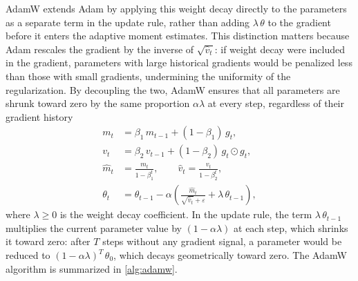AdamW extends Adam by applying this weight decay directly to the
parameters as a separate term in the update rule, rather than adding
$\lambda\,\theta$ to the gradient before it enters the adaptive moment
estimates. This distinction matters because Adam rescales the gradient by
the inverse of $\sqrt{\hat{v}_t}$: if weight decay were included in the
gradient, parameters with large historical gradients would be penalized
less than those with small gradients, undermining the uniformity of the
regularization. By decoupling the two, AdamW ensures that all parameters
are shrunk toward zero by the same proportion $\alpha \lambda$ at every
step, regardless of their gradient history
\begin{align*}
    m_t &= \beta_1\, m_{t-1} + (1 - \beta_1)\, g_t, \\
    v_t &= \beta_2\, v_{t-1} + (1 - \beta_2)\, g_t \odot g_t, \\
    \hat{m}_t &= \frac{m_t}{1 - \beta_1^t}, \qquad
    \hat{v}_t = \frac{v_t}{1 - \beta_2^t}, \\
    \theta_t &= \theta_{t-1}
      - \alpha \left(
        \frac{\hat{m}_t}{\sqrt{\hat{v}_t} + \varepsilon}
        + \lambda\, \theta_{t-1}
      \right),
\end{align*}
where $\lambda \geq 0$ is the weight decay coefficient. In the update
rule, the term $\lambda\,\theta_{t-1}$ multiplies the current parameter
value by $(1 - \alpha\lambda)$ at each step, which shrinks it toward zero:
after $T$ steps without any gradient signal, a parameter would be reduced
to $(1 - \alpha\lambda)^T\,\theta_0$, which decays geometrically toward
zero. The AdamW algorithm is summarized in \autoref{alg:adamw}.


